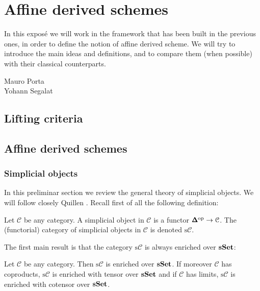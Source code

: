 \chapter{Affine derived schemes}


\begin{refsection}

In this expos\'e we will work in the framework that has been built in the previous ones, in order to define the notion of affine derived scheme. We will try to introduce the main ideas and definitions, and to compare them (when possible) with their classical counterparts.

\begin{flushright}
Mauro Porta \\
Yohann Segalat
\end{flushright}

\section{Lifting criteria}


\section{Affine derived schemes}

\subsection{Simplicial objects}

In this preliminar section we review the general theory of simplicial objects. We will follow closely Quillen \cite[II.1, II.4]{quillen}. Recall first of all the following definition:

\begin{defin}
Let $\mathcal C$ be any category. A simplicial object in $\mathcal C$ is a functor $\pmb{\Delta}^{\mathrm{op}} \to \mathcal C$. The (functorial) category of simplicial objects in $\mathcal C$ is denoted $\mathrm s \mathcal C$.
\end{defin}

The first main result is that the category $\mathrm s \mathcal C$ is always enriched over $\mathbf{sSet}$:

\begin{thm} \label{thm quillen 1}
Let $\mathcal C$ be any category. Then $\mathrm s \mathcal C$ is enriched over $\mathbf{sSet}$. If moreover $\mathcal C$ has coproducts, $\mathrm s \mathcal C$ is enriched with tensor over $\mathbf{sSet}$ and if $\mathcal C$ has limits, $\mathrm s \mathcal C$ is enriched with cotensor over $\mathbf{sSet}$.
\end{thm}


\end{refsection}
